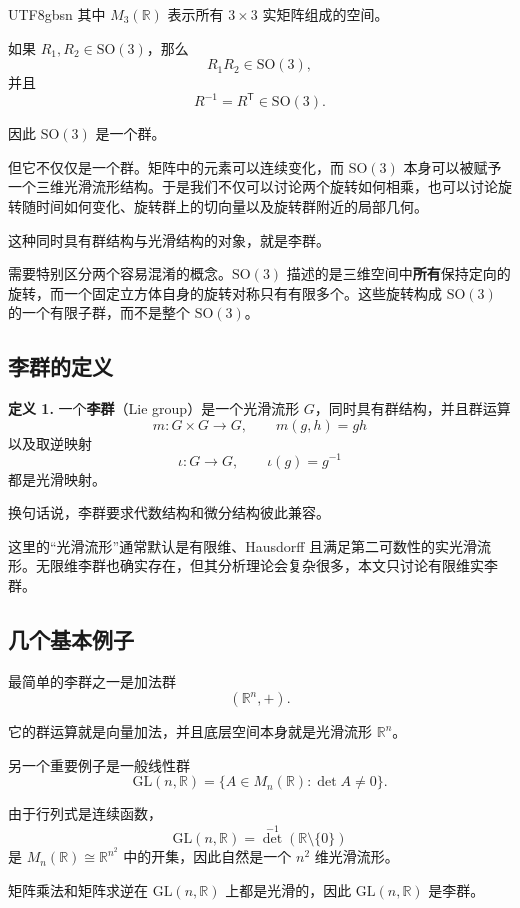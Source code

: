 \documentclass[11pt]{article}
\begin{document}
\begin{CJK*}{UTF8}{gbsn}
其中 $M_3(\mathbb{R})$ 表示所有 $3\times 3$ 实矩阵组成的空间。

如果 $R_1,R_2\in\mathrm{SO}(3)$，那么
\[
R_1R_2\in\mathrm{SO}(3),
\]
并且
\[
R^{-1}=R^{\mathsf T}\in\mathrm{SO}(3).
\]

因此 $\mathrm{SO}(3)$ 是一个群。

但它不仅仅是一个群。矩阵中的元素可以连续变化，而 $\mathrm{SO}(3)$ 本身可以被赋予一个三维光滑流形结构。于是我们不仅可以讨论两个旋转如何相乘，也可以讨论旋转随时间如何变化、旋转群上的切向量以及旋转群附近的局部几何。

这种同时具有群结构与光滑结构的对象，就是李群。

需要特别区分两个容易混淆的概念。$\mathrm{SO}(3)$ 描述的是三维空间中\textbf{所有}保持定向的旋转，而一个固定立方体自身的旋转对称只有有限多个。这些旋转构成 $\mathrm{SO}(3)$ 的一个有限子群，而不是整个 $\mathrm{SO}(3)$。


\subsection{李群的定义}

\textbf{定义 1.}
一个\textbf{李群}（Lie group）是一个光滑流形 $G$，同时具有群结构，并且群运算
\[
m:G\times G\to G,
\qquad
m(g,h)=gh
\]
以及取逆映射
\[
\iota:G\to G,
\qquad
\iota(g)=g^{-1}
\]
都是光滑映射。

换句话说，李群要求代数结构和微分结构彼此兼容。

这里的“光滑流形”通常默认是有限维、Hausdorff 且满足第二可数性的实光滑流形。无限维李群也确实存在，但其分析理论会复杂很多，本文只讨论有限维实李群。


\subsection{几个基本例子}

最简单的李群之一是加法群
\[
(\mathbb{R}^n,+).
\]

它的群运算就是向量加法，并且底层空间本身就是光滑流形 $\mathbb{R}^n$。

另一个重要例子是一般线性群
\[
\mathrm{GL}(n,\mathbb{R})
=
\{A\in M_n(\mathbb{R}):\det A\neq 0\}.
\]

由于行列式是连续函数，
\[
\mathrm{GL}(n,\mathbb{R})
=
\det^{-1}(\mathbb{R}\setminus\{0\})
\]
是 $M_n(\mathbb{R})\cong\mathbb{R}^{n^2}$ 中的开集，因此自然是一个 $n^2$ 维光滑流形。

矩阵乘法和矩阵求逆在 $\mathrm{GL}(n,\mathbb{R})$ 上都是光滑的，因此 $\mathrm{GL}(n,\mathbb{R})$ 是李群。


\end{CJK*}
\end{document}
